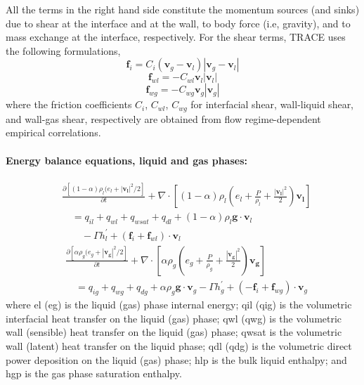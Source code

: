 All the terms in the right hand side constitute the momentum sources (and sinks) due to shear at the interface and at the wall, 
to body force (i.e, gravity), 
and to mass exchange at the interface, respectively.
For the shear terms, TRACE uses the following formulations,
\begin{equation}
	\mathbf{f}_i = C_i (\mathbf{v}_g - \mathbf{v}_l) |\mathbf{v}_g - \mathbf{v}_l| 
\label{eq:fi}
\end{equation}
\begin{equation}
	\mathbf{f}_{wl} = - C_{wl} \mathbf{v}_l |\mathbf{v}_l|
\label{eq:fwl}
\end{equation}
\begin{equation}
	\mathbf{f}_{wg} = - C_{wg} \mathbf{v}_g |\mathbf{v}_g|
\label{eq:fwg}
\end{equation}
where the friction coefficients $C_i$, $C_{wl}$, $C_{wg}$ for interfacial shear, wall-liquid shear, and wall-gas shear, respectively 
are obtained from flow regime-dependent empirical correlations.

\paragraph{Energy balance equations, liquid and gas phases:}
\begin{equation}
	\begin{split}
		& \frac{\partial [(1-\alpha)\rho_l(e_l + |\mathbf{v_l}|^2/2]}{\partial t} + \nabla \cdot \left[(1-\alpha) \rho_l \left(e_l+\frac{P}{\rho_l}+\frac{|\mathbf{v_l}|^2}{2}\right) \mathbf{v_l} \right] \\
		&	\quad = q_{il} + q_{wl} + q_{wsat} + q_{dl} + (1 - \alpha) \rho_l \mathbf{g} \cdot \mathbf{v}_l \\
		& \qquad - \Gamma h^\prime_l + (\mathbf{f}_{i} + \mathbf{f}_{wl}) \cdot \mathbf{v}_l
	\end{split}
\label{eq:energy_balance_liquid}
\end{equation}
\begin{equation}
	\begin{split}
		 & \frac{\partial [\alpha \rho_g (e_g + |\mathbf{v_g}|^2/2]}{\partial t} + \nabla \cdot \left[\alpha \rho_g \left(e_g+\frac{P}{\rho_g}+\frac{|\mathbf{v_g}|^2}{2}\right) \mathbf{v_g} \right] \\
		 & \quad  = q_{ig} + q_{wg} + q_{dg} + \alpha \rho_g \mathbf{g} \cdot \mathbf{v}_g - \Gamma h^\prime_g + (-\mathbf{f}_{i} + \mathbf{f}_{wg}) \cdot \mathbf{v}_g
	\end{split}
\label{eq:energy_balance_gas}
\end{equation}
where \gls{el} (\gls{eg}) is the liquid (gas) phase internal energy;
\gls{qil} (\gls{qig}) is the volumetric interfacial heat transfer on the liquid (gas) phase;
\gls{qwl} (\gls{qwg}) is the volumetric wall (sensible) heat transfer on the liquid (gas) phase;
\gls{qwsat} is the volumetric wall (latent) heat transfer on the liquid phase;
\gls{qdl} (\gls{qdg}) is the volumetric direct power deposition on the liquid (gas) phase;
\gls{hlp} is the bulk liquid enthalpy;
and \gls{hgp} is the gas phase saturation enthalpy.

